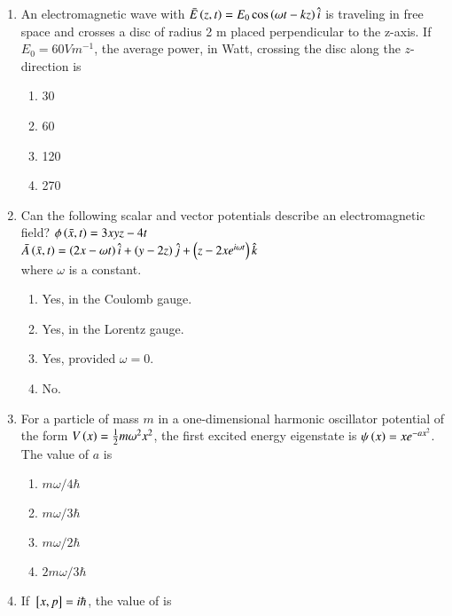 \documentclass[journal]{IEEEtran}
\begin{document}
\begin{enumerate}[start=35]
	\item An electromagnetic wave with $\bar{E}\left(z,t\right)=E_0\cos\left(\omega t-kz\right)\hat{i}$ is traveling in free space and crosses a disc of radius 2 m placed perpendicular to the z-axis. If $E_0=60 V m^{-1}$, the average power, in Watt, crossing the disc along the $z$-direction is 
\begin{multicols}{4}
\begin{enumerate}
    \item 30
    \item 60
    \item 120
    \item 270
\end{enumerate}
\end{multicols}
\item Can the following scalar and vector potentials describe an electromagnetic field? 
$\phi\left(\bar{x},t\right)=3xyz-4t$ \\
$\bar{A}\left(\bar{x},t\right)=\left(2x-\omega t\right)\hat{i}+\left(y-2z\right)\hat{j}+\left(z-2xe^{i\omega t}\right)\hat{k}$
\\ where $\omega$ is a constant.
\begin{multicols}{2}
    \begin{enumerate}
        \item Yes, in the Coulomb gauge.
        \item Yes, in the Lorentz gauge.
        \item Yes, provided $\omega = 0$.
        \item No.
    \end{enumerate}
\end{multicols}
\item For a particle of mass $m$ in a one-dimensional harmonic oscillator potential of the form $V\left(x\right)=\frac{1}{2}m{\omega}^2x^2$, the first excited energy eigenstate is $\psi \left(x\right)=xe^{-ax^2}$. The value of $a$ is
\begin{multicols}{4}
    \begin{enumerate}
        \item $m\omega/4\hbar$
        \item $m\omega/3\hbar$
        \item $m\omega/2\hbar$
        \item $2m\omega/3\hbar$
    \end{enumerate}
\end{multicols}
\item If ${}\left[x,p\right]=i\hbar$, the value of  is

\end{enumerate}
\end{document}

